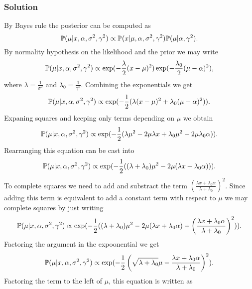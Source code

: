 \documentclass{article}
\begin{document}
\subsubsection*{Solution}
By Bayes rule the posterior can be computed as
\begin{equation*}
\mathbb{P}(\mu|x,\alpha,\sigma^2,\gamma^2)\propto\mathbb{P}(x|\mu,\alpha,\sigma^{2},\gamma^{2})\mathbb{P}(\mu|\alpha,\gamma^{2}).
\end{equation*}
By normality hypothesis on the likelihood and the prior we may write
\begin{equation*}
\mathbb{P}(\mu|x,\alpha,\sigma^2,\gamma^2)\propto\exp(-\frac{\lambda}{2}(x-\mu)^{2})\exp(-\frac{\lambda_{0}}{2}(\mu-\alpha)^{2}),
\end{equation*}
where $\lambda=\frac{1}{\sigma^{2}}$ and $\lambda_{0}=\frac{1}{\gamma^{2}}$. Combining the exponentials we get
\begin{equation*}
\mathbb{P}(\mu|x,\alpha,\sigma^2,\gamma^2)\propto \exp(-\frac{1}{2}(\lambda(x-\mu)^{2}+\lambda_{0}(\mu-\alpha)^{2})).
\end{equation*}
Expaning squares and keeping only terms depending on $\mu$ we obtain
\begin{equation*}
\mathbb{P}(\mu|x,\alpha,\sigma^2,\gamma^2)\propto\exp(-\frac{1}{2}(\lambda\mu^{2}-2\mu\lambda x+\lambda_{0}\mu^{2}-2\mu\lambda_{0}\alpha)).
\end{equation*}
Rearranging this equation can be cast into
\begin{equation*}
\mathbb{P}(\mu|x,\alpha,\sigma^2,\gamma^2)\propto\exp(-\frac{1}{2}((\lambda+\lambda_{0})\mu^{2}-2\mu(\lambda x+\lambda_{0}\alpha))).
\end{equation*}
To complete squares we need to add and substract the term $\left(\frac{\lambda x+\lambda_{0}\alpha}{\lambda+\lambda_{0}}\right)^{2}$. Since adding this term
is equivalent to add a constant term with respect to $\mu$ we may complete squares by just writing 
\begin{equation*}
\mathbb{P}(\mu|x,\alpha,\sigma^2,\gamma^2)\propto\exp(-\frac{1}{2}((\lambda+\lambda_{0})\mu^{2}-2\mu(\lambda x+\lambda_{0}\alpha)+\left(\frac{\lambda x+\lambda_{0}\alpha}{\lambda+\lambda_{0}}\right)^{2})).
\end{equation*}
Factoring the argument in the expoonential we get
\begin{equation*}
\mathbb{P}(\mu|x,\alpha,\sigma^2,\gamma^2)\propto\exp(-\frac{1}{2}\left(\sqrt{\lambda+\lambda_{0}}\mu-\frac{\lambda x+\lambda_{0}\alpha}{\lambda+\lambda_{0}}\right)^{2}).
\end{equation*}
Factoring the term to the left of $\mu$, this equation is written as
\end{document}
